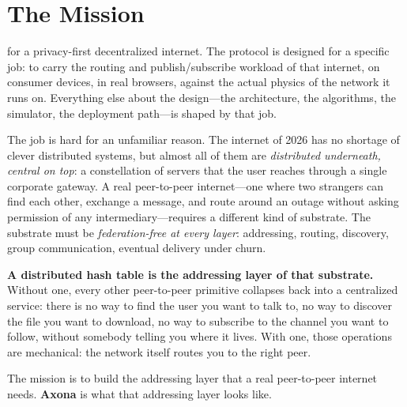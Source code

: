 \documentclass[nobib]{tufte-handout}
\begin{document}
\vspace{1em}

\section{The Mission}

 for a privacy-first
decentralized internet. The protocol is designed for a specific job:
to carry the routing and publish/subscribe workload of that internet,
on consumer devices, in real browsers, against the actual physics of
the network it runs on. Everything else about the design---the
architecture, the algorithms, the simulator, the deployment path---is
shaped by that job.

The job is hard for an unfamiliar reason. The internet of 2026 has
no shortage of clever distributed systems, but almost all of them
are \emph{distributed underneath, central on top}: a constellation
of servers that the user reaches through a single corporate
gateway. A real peer-to-peer
internet---one where two strangers can find each other, exchange a
message, and route around an outage without asking permission of any
intermediary---requires a different kind of substrate. The substrate
must be \emph{federation-free at every layer}: addressing, routing,
discovery, group communication, eventual delivery under churn.

\textbf{A distributed hash table is the addressing layer of that
substrate.} Without one, every other peer-to-peer primitive
collapses back into a centralized service: there is no way to find
the user you want to talk to, no way to discover the file you want
to download, no way to subscribe to the channel you want to follow,
without somebody telling you where it lives. With one, those
operations are mechanical: the network itself routes you to the
right peer.

The mission is to build the addressing layer that a real
peer-to-peer internet needs. \textbf{Axona} is what that
addressing layer looks like.
\end{document}
